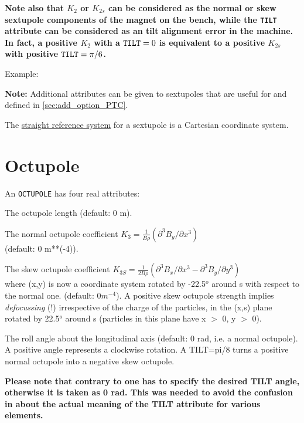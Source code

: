\textbf{Note also that $K_2$ or $K_{2s}$ can be considered as the normal
  or skew sextupole components of the magnet on the bench, while the
  {\tt TILT} attribute can be considered as an tilt alignment error in the
  machine. In fact, a positive $K_2$ with a ${\tt TILT} = 0$ is equivalent to a
  positive $K_{2s}$ with positive ${\tt TILT} = \pi/6$.} 

Example: 

{\bf Note:} Additional attributes can be given to sextupoles that
are useful for \ptc and defined in \ref{sec:add_option_PTC}.

The \hyperref[subsec:local_straight]{straight reference system} for a
sextupole is a Cartesian coordinate system.   


\section{Octupole}
\label{sec:octupole}


An {\tt OCTUPOLE} has four real attributes: 
\begin{madlist}
    The octupole length (default: 0 m). 

    The normal octupole coefficient 
     $K_3 = \frac{1}{B \rho} (\partial^3B_y / \partial x^3)$ \\ 
     (default: 0 m**(-4)). 

    The skew octupole coefficient 
     $K_{3S} = \frac{1}{2 B\rho} (\partial^3B_x/\partial x^3 -
   \partial^3B_y/\partial y^3)$ \\
     where (x,y) is now a coordinate system rotated by -22.5$^o$ around
     s with respect to the normal one. (default: $0 m^{-4}$). A positive
     skew octupole strength implies {\sl defocussing} (!) 
     irrespective of the charge of the particles,
     in the (x,s) plane rotated by 22.5$^o$ around s
     (particles in this plane have x $>$ 0, y $>$ 0).  

    The roll angle about the longitudinal axis (default: 0
     rad, i.e. a normal octupole). A positive angle represents a
     clockwise rotation. A TILT=pi/8 turns a positive normal octupole
     into a negative skew octupole.  

     \textbf{Please note that contrary to \madeight one has to specify the
       desired TILT angle, otherwise it is taken as 0 rad. This was
       needed to avoid the confusion in \madeight about the actual meaning of
       the TILT attribute for various elements. }

\end{madlist}

